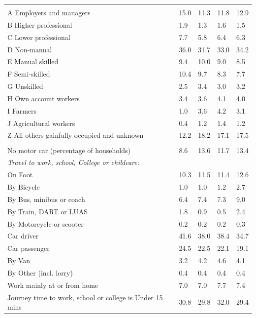 \documentclass{article}
\begin{document}
\begin{table}[h]
\begin{tabular}{KTTTT}
\hline
    \\ 
    \hline
A Employers and managers & 15.0& 11.3& 11.8& 12.9\\
B Higher professional & 1.9& 1.3& 1.6& 1.5\\
C Lower professional & 7.7& 5.8& 6.4& 6.3\\
D Non-manual & 36.0& 31.7& 33.0& 34.2\\
E Manual skilled &  9.4& 10.0&  9.0&  8.5\\
F Semi-skilled & 10.4&  9.7&  8.3&  7.7\\
G Unskilled & 2.5& 3.4& 3.0& 3.2\\
H Own account workers & 3.4& 3.6& 4.1& 4.0\\
I Farmers & 1.0& 3.6& 4.2& 3.1\\
J Agricultural workers & 0.4& 1.2& 1.4& 1.2\\
Z All others gainfully occupied and unknown & 12.2& 18.2& 17.1& 17.5\\
\hline
{}\hline
    \\ 
    \hline
No motor car (percentage of households) &  8.6& 13.6& 11.7& 
13.4\\
    \hline 
\emph{Travel to work, school, College or childcare:} & & & \\
\quad On Foot & 10.3& 11.5& 11.4& 12.6\\ 
\quad By Bicycle & 1.0& 1.0& 1.2& 2.7\\ 
\quad By Bus, minibus or coach & 6.4& 7.4& 7.3& 9.0\\
\quad By Train, DART or LUAS & 1.8& 0.9& 0.5& 2.4\\
\quad By Motorcycle or scooter & 0.2& 0.2& 0.2& 0.3\\
\quad Car driver & 41.6 & 38.0& 38.4& 34.7\\
\quad Car passenger & 24.5& 22.5& 22.1& 19.1\\
\quad By Van & 3.2& 4.2& 4.6& 4.1\\
\quad By Other (incl. lorry) & 0.4& 0.4& 0.4& 0.4\\
    \hline
Work mainly at or from home & 7.0& 7.0& 7.7& 7.4\\
Journey time to work, school or college is Under 15 mins & 30.8& 29.8& 32.0& 29.4\\

\end{tabular}
\end{table}
\end{document}
